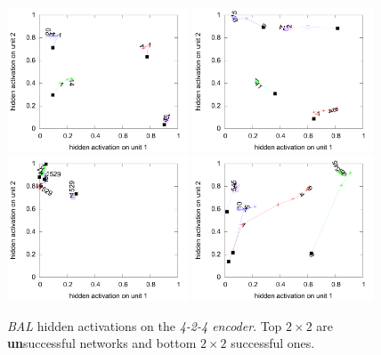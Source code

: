 \begin{figure}[H]
  \includegraphics[width=0.48\textwidth]{img/hid-bal-good-init.pdf}  
  \includegraphics[width=0.48\textwidth]{img/hid-bal-good-convex.pdf}  \\
  \includegraphics[width=0.48\textwidth]{img/hid-bal-good-step.pdf}  
  \includegraphics[width=0.48\textwidth]{img/hid-bal-good-stagnation.pdf}  \\ 
  \caption{\emph{BAL} hidden activations on the \emph{4-2-4 encoder}. Top $2\times2$ are {\bf un}successful networks and bottom $2\times2$ successful ones.}
  \label{fig:results-hidden-activations-bal}
\end{figure}

